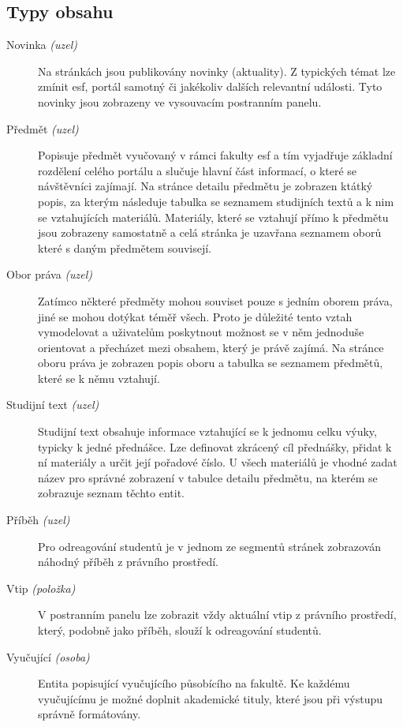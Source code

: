\subsection*{Typy obsahu}

\begin{description}
  \item[Novinka \emph{(uzel)}] Na stránkách jsou publikovány novinky (aktuality). Z typických témat lze zmínit \gls{esf}, portál samotný či jakékoliv dalších relevantní události. Tyto novinky jsou zobrazeny ve vysouvacím postranním panelu.
  
  \item[Předmět \emph{(uzel)}] Popisuje předmět vyučovaný v rámci fakulty \gls{esf} a tím vyjadřuje základní rozdělení celého portálu a slučuje hlavní část informací, o které se návštěvníci zajímají. Na stránce detailu předmětu je zobrazen ktátký popis, za kterým následuje tabulka se seznamem studijních textů a k nim se vztahujících materiálů. Materiály, které se vztahují přímo k předmětu jsou zobrazeny samostatně a celá stránka je uzavřana seznamem oborů které s daným předmětem souvisejí.

  \item[Obor práva \emph{(uzel)}] Zatímco některé předměty mohou souviset pouze s jedním oborem práva, jiné se mohou dotýkat téměř všech. Proto je důležité tento vztah vymodelovat a uživatelům poskytnout možnost se v něm jednoduše orientovat a přecházet mezi obsahem, který je právě zajímá. Na stránce oboru práva je zobrazen popis oboru a tabulka se seznamem předmětů, které se k němu vztahují.

  \item[Studijní text \emph{(uzel)}] Studijní text obsahuje informace vztahující se k jednomu celku výuky, typicky k jedné přednášce. Lze definovat zkrácený cíl přednášky, přidat k ní materiály a určit její pořadové číslo. U všech materiálů je vhodné zadat název pro správné zobrazení v tabulce detailu předmětu, na kterém se zobrazuje seznam těchto entit.

  \item[Příběh \emph{(uzel)}] Pro odreagování studentů je v jednom ze segmentů stránek zobrazován náhodný příběh z právního prostředí. 

  \item[Vtip \emph{(položka)}] V postranním panelu lze zobrazit vždy aktuální vtip z právního prostředí, který, podobně jako příběh, slouží k odreagování studentů. 

  \item[Vyučující \emph{(osoba)}] Entita popisující vyučujícího působícího na fakultě. Ke každému vyučujícímu je možné doplnit akademické tituly, které jsou při výstupu správně formátovány.
\end{description}


